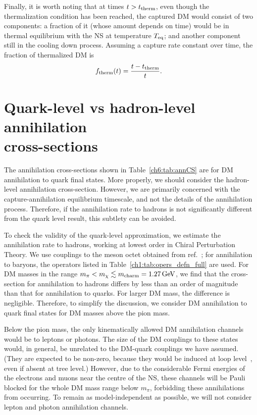 Finally, it is worth noting that at times  $t>t_{\rm therm}$, even though the thermalization condition has been reached, the captured DM would consist of two components: a fraction of it (whose amount depends on time) would be in thermal equilibrium with the NS at temperature $T_{\rm eq}$; and another component still in the cooling down process. Assuming a  capture rate constant over time, the fraction of thermalized DM is 
\begin{equation}
    f_{\rm therm}(t) = \frac{t-t_{\rm therm}}{t}.
\end{equation}




\section[Quark-level vs hadron-level annihilation cross-sections]{Quark-level vs hadron-level annihilation\\cross-sections}
\label{sec:quarkhadron}

The annihilation cross-sections shown in Table~\ref{ch6:tab:annCS} are for DM annihilation to quark final states.  More properly, we should consider the hadron-level annihilation cross-section.
However, we are primarily concerned with the capture-annihilation equilibrium timescale, and not the details of the annihilation process. Therefore, if the annihilation rate to hadrons is not significantly different from the quark level result, this subtlety can be avoided. 

To check the validity of the quark-level approximation, we estimate the annihilation rate to hadrons, working at lowest order in Chiral Perturbation Theory. We use couplings to the meson octet obtained from  ref.~\cite{Kumar:2018heq_dec_IndirectDetectionSubGeV}; for annihilation to baryons, the operators listed in Table~\ref{ch1:tab:opers_defn_full} are used. 
For DM masses in the range $m_\pi < m_\chi \lesssim m_{\rm charm} = 1.27{\rm \,GeV}$, we find that the cross-section for annihilation to hadrons differs by less than an order of magnitude than that for annihilation to quarks. For larger DM mass, the difference is negligible. Therefore, to simplify the discussion, we consider DM annihilation to quark final states for DM masses above the pion mass.


Below the pion mass, the only kinematically allowed DM annihilation channels would be to leptons or photons. The size of the DM couplings to these states would, in general, be unrelated to the DM-quark couplings we have assumed. (They are expected to be non-zero, because they would be induced at loop level~\cite{Bell:2019pyc_jun_CaptureLeptophilicDark}, even if absent at tree level.)
However, due to the considerable Fermi energies of the electrons and muons near the centre of the NS, these channels will be Pauli blocked for the whole DM mass range below $m_\pi$, forbidding these annihilations from occurring. To remain as model-independent as possible, we will not consider lepton and photon annihilation channels.

